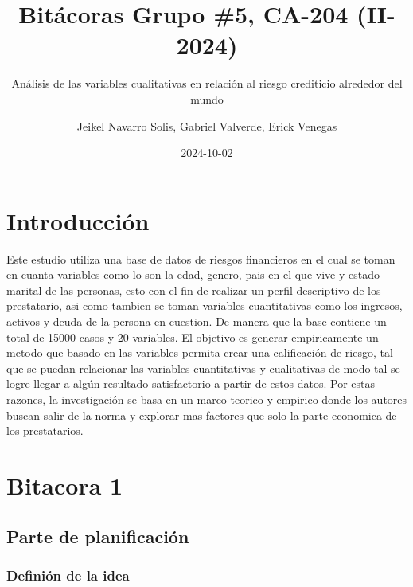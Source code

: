 \documentclass[
  letterpaper,
  DIV=11,
  numbers=noendperiod]{scrreprt}
\title{Bitácoras Grupo \#5, CA-204 (II-2024)}
\subtitle{Análisis de las variables cualitativas en relación al riesgo
crediticio alrededor del mundo}
\author{Jeikel Navarro Solis, Gabriel Valverde, Erick Venegas}
\date{2024-10-02}
\renewcommand*\contentsname{Tabla de contenidos}
\newcommand\contentsname{Tabla de contenidos}
\begin{document}
\maketitle

\renewcommand*\contentsname{Tabla de contenidos}
{
\hypersetup{linkcolor=}
\setcounter{tocdepth}{2}
\tableofcontents
}


\chapter*{Introducción}\label{introducciuxf3n}


Este estudio utiliza una base de datos de riesgos financieros en el cual
se toman en cuanta variables como lo son la edad, genero, pais en el que
vive y estado marital de las personas, esto con el fin de realizar un
perfil descriptivo de los prestatario, asi como tambien se toman
variables cuantitativas como los ingresos, activos y deuda de la persona
en cuestion. De manera que la base contiene un total de 15000 casos y 20
variables. El objetivo es generar empiricamente un metodo que basado en
las variables permita crear una calificación de riesgo, tal que se
puedan relacionar las variables cuantitativas y cualitativas de modo tal
se logre llegar a algún resultado satisfactorio a partir de estos datos.
Por estas razones, la investigación se basa en un marco teorico y
empirico donde los autores buscan salir de la norma y explorar mas
factores que solo la parte economica de los prestatarios.


\chapter{Bitacora 1}\label{bitacora-1}

\section{Parte de planificación}\label{parte-de-planificaciuxf3n}

\subsection{Definión de la idea}\label{definiuxf3n-de-la-idea}
\end{document}
